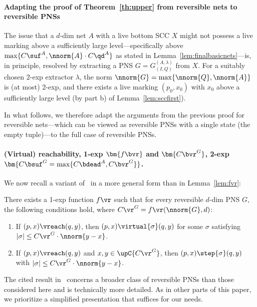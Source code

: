 \paragraph{Adapting the proof of Theorem~\ref{th:upper} from 
reversible nets to reversible PNSs}
The issue that a $d$-dim net $A$ with a live bottom SCC $X$ might not
possess a live marking 
above a sufficiently large level---specifically above
$\max\{C\suf^A,\nnorm{A}\cdot C\qd^A\}$ as stated in
Lemma~\ref{lem:finalbasicnets}---is, in principle,
resolved by extracting a PNS $G=G_{(I,Q)}^{(A,\lambda)}$ from $X$.
For a suitably chosen 2-exp extractor $\lambda$, the norm
$\nnorm{G}=\max\{\nnorm{Q},\nnorm{A}\}$ is (at most) 2-exp, and there
exists a live marking $(p_0,x_0)$ with $x_0$ above a sufficiently
large level (by part b) of Lemma~\ref{lem:sccfirst}).

In what follows, we therefore adapt the arguments from the previous proof
for reversible nets---which can be viewed as reversible PNSs with a
single state (the empty tuple)---to the full case of reversible PNSs.


\paragraph{(Virtual) reachability, 1-exp
$\bm{f\bvr}$ and $\bm{C\bvr^G}$, 2-exp
$\bm{C\bsuf^G=\max\{C\bdead^A,C\bvr^G\}}$.}
We now recall a variant of~\cite[Lemma~5]{DBLP:conf/fsttcs/Leroux19} in a more
general form than in Lemma~\ref{lem:fvr}:

\begin{lem}\label{lem:pnsreachfirst}
	There exists a 1-exp function $f\vr$ such that 
for every reversible $d$-dim PNS $G$, the following conditions hold,
	where	
$C\vr^G=f\vr(\nnorm{G},d)$:
	\begin{enumerate}
		\item
			If $(p,x)\vreach (q,y)$, then
			$(p,x)\virtual{\sigma}(q,y)$
for some $\sigma$ satisfying
			$|\sigma|\leq
					C\vr^G\cdot \nnorm{y-x}$.
\item
	If $(p,x)\vreach (q,y)$
			and  $x,y\in\upC{C\vr^G}$, 
			then $(p,x)\step{\sigma}(q,y)$
	with
		$|\sigma|\leq
		C\vr^G\cdot \nnorm{y-x}$.
	\end{enumerate}


\end{lem}
\begin{rem}
The cited result in~\cite{DBLP:conf/fsttcs/Leroux19} concerns
a broader class 
of reversible PNSs than those considered here and is technically more
detailed.
As in other parts of this paper, we prioritize a simplified presentation 
that suffices for our needs.
\end{rem}


